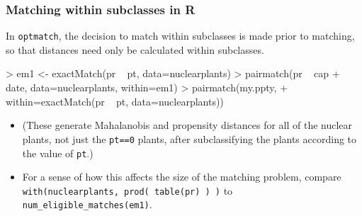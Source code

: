 \begin{frame}[fragile]
  \frametitle{Matching within subclasses in R}

In \texttt{optmatch}, the decision to match within subclasses is made
prior to matching, so that distances need only be calculated within subclasses.

\begin{Schunk}
\begin{Sinput}
> em1 <- exactMatch(pr ~ pt, data=nuclearplants)
> pairmatch(pr ~ cap + date, data=nuclearplants, within=em1) 
> pairmatch(my.ppty, 
+          within=exactMatch(pr ~ pt, data=nuclearplants))
\end{Sinput}
\end{Schunk}


\begin{itemize}
\item (These generate Mahalanobis and propensity distances for all of the nuclear plants, not just the \texttt{pt==0} plants, after subclassifying the plants according to the value of \texttt{pt}.)
\item<+-> For a sense of how this affects the size of the matching
  problem, compare \texttt{with(nuclearplants, prod( table(pr) ) )}  to
  \texttt{num\_eligible\_matches(em1)}. 
\end{itemize}
\end{frame}
\note{
}
